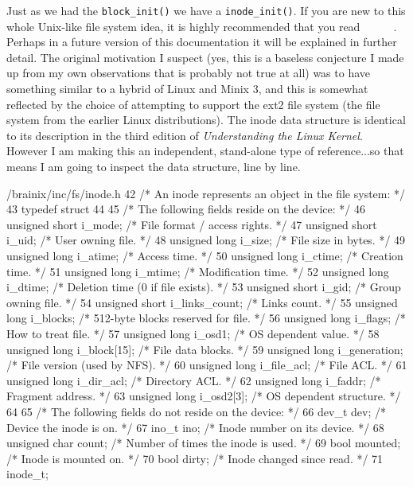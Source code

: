 \documentclass{article}
\begin{document}
Just as we had the \verb|block_init()| we have a \verb|inode_init()|. If you are new to this whole Unix-like file system idea, it is highly recommended that you read~\cite{1}~\cite{2}~\cite{3}~\cite{4}~\cite{5}~\cite{6}. Perhaps in a future version of this documentation it will be explained in further detail. The original motivation I suspect (yes, this is a baseless conjecture I made up from my own observations that is probably not true at all) was to have something similar to a hybrid of Linux and Minix 3, and this is somewhat reflected by the choice of attempting to support the ext2 file system (the file system from the earlier Linux distributions). The inode data structure is identical to its description in the third edition of \textit{Understanding the Linux Kernel}. However I am making this an independent, stand-alone type of reference...so that means I am going to inspect the data structure, line by line.\marginpar[inode\_t]{}
\begin{code}{/brainix/inc/fs/inode.h}
42 /* An inode represents an object in the file system: */
43 typedef struct
44 {
45      /* The following fields reside on the device: */
46      unsigned short i_mode;        /* File format / access rights.       */
47      unsigned short i_uid;         /* User owning file.                  */
48      unsigned long i_size;         /* File size in bytes.                */
49      unsigned long i_atime;        /* Access time.                       */
50      unsigned long i_ctime;        /* Creation time.                     */
51      unsigned long i_mtime;        /* Modification time.                 */
52      unsigned long i_dtime;        /* Deletion time (0 if file exists).  */
53      unsigned short i_gid;         /* Group owning file.                 */
54      unsigned short i_links_count; /* Links count.                       */
55      unsigned long i_blocks;       /* 512-byte blocks reserved for file. */
56      unsigned long i_flags;        /* How to treat file.                 */
57      unsigned long i_osd1;         /* OS dependent value.                */
58      unsigned long i_block[15];    /* File data blocks.                  */
59      unsigned long i_generation;   /* File version (used by NFS).        */
60      unsigned long i_file_acl;     /* File ACL.                          */
61      unsigned long i_dir_acl;      /* Directory ACL.                     */
62      unsigned long i_faddr;        /* Fragment address.                  */
63      unsigned long i_osd2[3];      /* OS dependent structure.            */
64 
65      /* The following fields do not reside on the device: */
66      dev_t dev;                    /* Device the inode is on.            */
67      ino_t ino;                    /* Inode number on its device.        */
68      unsigned char count;          /* Number of times the inode is used. */
69      bool mounted;                 /* Inode is mounted on.               */
70      bool dirty;                   /* Inode changed since read.          */
71 } inode_t;
\end{code}
\end{document}
